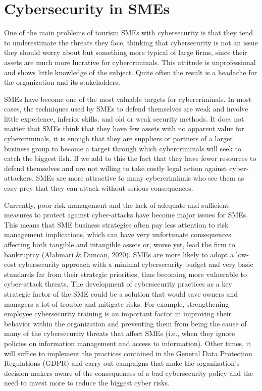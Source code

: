 \documentclass[
  letterpaper,
  DIV=11,
  numbers=noendperiod]{scrreprt}
\begin{document}
\hypertarget{cybersecurity-in-smes}{%
\section{Cybersecurity in SMEs}\label{cybersecurity-in-smes}}

One of the main problems of tourism SMEs with cybersecurity is that they
tend to underestimate the threats they face, thinking that cybersecurity
is not an issue they should worry about but something more typical of
large firms, since their assets are much more lucrative for
cybercriminals. This attitude is unprofessional and shows little
knowledge of the subject. Quite often the result is a headache for the
organization and its stakeholders.

SMEs have become one of the most valuable targets for cybercriminals. In
most cases, the techniques used by SMEs to defend themselves are weak
and involve little experience, inferior skills, and old or weak security
methods. It does not matter that SMEs think that they have few assets
with no apparent value for cybercriminals, it is enough that they are
suppliers or partners of a larger business group to become a target
through which cybercriminals will seek to catch the biggest fish. If we
add to this the fact that they have fewer resources to defend themselves
and are not willing to take costly legal action against cyber-attackers,
SMEs are more attractive to many cybercriminals who see them as easy
prey that they can attack without serious consequences.

Currently, poor risk management and the lack of adequate and sufficient
measures to protect against cyber-attacks have become major issues for
SMEs. This means that SME business strategies often pay less attention
to risk management implications, which can have very unfortunate
consequences affecting both tangible and intangible assets or, worse
yet, lead the firm to bankruptcy (Alahmari \& Duncan, 2020). SMEs are
more likely to adopt a low-cost cybersecurity approach with a minimal
cybersecurity budget and very basic standards far from their strategic
priorities, thus becoming more vulnerable to cyber-attack threats. The
development of cybersecurity practices as a key strategic factor of the
SME could be a solution that would save owners and managers a lot of
trouble and mitigate risks. For example, strengthening employee
cybersecurity training is an important factor in improving their
behavior within the organization and preventing them from being the
cause of many of the cybersecurity threats that affect SMEs (i.e., when
they ignore policies on information management and access to
information). Other times, it will suffice to implement the practices
contained in the General Data Protection Regulations (GDPR) and carry
out campaigns that make the organization's decision makers aware of the
consequences of a bad cybersecurity policy and the need to invest more
to reduce the biggest cyber risks.
\end{document}
